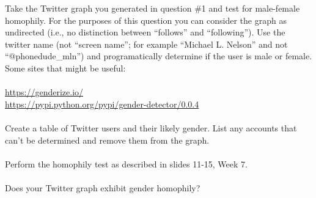 Take the Twitter graph you generated in question \#1 and test for
male-female homophily.  For the purposes of this question you can
consider the graph as undirected (i.e., no distinction between
\enquote{follows} and \enquote{following}).  Use the twitter name (not \enquote{screen
name}; for example \enquote{Michael L. Nelson} and not \enquote{{@}phonedude\_mln})
and programatically determine if the user is male or female.  Some
sites that might be useful:\\
\\
\url{https://genderize.io/}\\
\url{https://pypi.python.org/pypi/gender-detector/0.0.4}\\
\\
Create a table of Twitter users and their likely gender.  List any 
accounts that can't be determined and remove them from the graph.\\
\\
Perform the homophily test as described in slides 11-15, Week 7.\\
\\
Does your Twitter graph exhibit gender homophily?